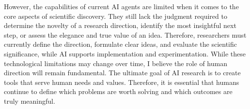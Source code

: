 However, the capabilities of current AI agents are limited when it comes to the core aspects of scientific discovery. They still lack the judgment required to determine the novelty of a research direction, identify the most insightful next step, or assess the elegance and true value of an idea. Therefore, researchers must currently define the direction, formulate clear ideas, and evaluate the scientific significance, while AI supports implementation and experimentation.
While these technological limitations may change over time, I believe the role of human direction will remain fundamental. The ultimate goal of AI research is to create tools that serve human needs and values. Therefore, it is essential that humans continue to define which problems are worth solving and which outcomes are truly meaningful.


